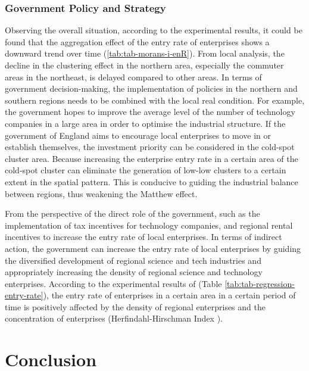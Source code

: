 \documentclass[
  12pt,
  oneside]{book}
\begin{document}
\hypertarget{government-policy-and-strategy}{%
\subsection{Government Policy and Strategy}\label{government-policy-and-strategy}}

Observing the overall situation, according to the experimental results, it could be found that the aggregation effect of the entry rate of enterprises shows a downward trend over time (\ref{tab:tab-morans-i-enR}). From local analysis, the decline in the clustering effect in the northern area, especially the commuter areas in the northeast, is delayed compared to other areas. In terms of government decision-making, the implementation of policies in the northern and southern regions needs to be combined with the local real condition. For example, the government hopes to improve the average level of the number of technology companies in a large area in order to optimise the industrial structure. If the government of England aims to encourage local enterprises to move in or establish themselves, the investment priority can be considered in the cold-spot cluster area. Because increasing the enterprise entry rate in a certain area of the cold-spot cluster can eliminate the generation of low-low clusters to a certain extent in the spatial pattern. This is conducive to guiding the industrial balance between regions, thus weakening the Matthew effect.

From the perspective of the direct role of the government, such as the implementation of tax incentives for technology companies, and regional rental incentives to increase the entry rate of local enterprises. In terms of indirect action, the government can increase the entry rate of local enterprises by guiding the diversified development of regional science and tech industries and appropriately increasing the density of regional science and technology enterprises. According to the experimental results of (Table \ref{tab:tab-regression-entry-rate}), the entry rate of enterprises in a certain area in a certain period of time is positively affected by the density of regional enterprises and the concentration of enterprises (Herfindahl-Hirschman Index ).

\hypertarget{conclusion-1}{%
\chapter{Conclusion}\label{conclusion-1}}
\end{document}
